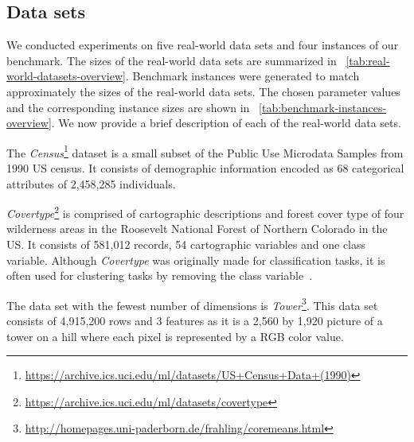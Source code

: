 

\subsection{Data sets}
We conducted experiments on five real-world data sets and four instances of our benchmark. The sizes of the real-world data sets are summarized in ~\cref{tab:real-world-datasets-overview}. Benchmark instances were generated to match approximately the sizes of the real-world data sets. The chosen parameter values and the corresponding instance sizes are shown in ~\cref{tab:benchmark-instances-overview}. 
We now provide a brief description of each of the real-world data sets.

The \textit{Census}\footnote{\url{https://archive.ics.uci.edu/ml/datasets/US+Census+Data+(1990)}} dataset is a small subset of the Public Use Microdata Samples from 1990 US census. It consists of demographic information encoded as 68 categorical attributes of 2,458,285 individuals. 

\textit{Covertype}\footnote{\url{https://archive.ics.uci.edu/ml/datasets/covertype}} is comprised of cartographic descriptions and forest cover type of four wilderness areas in the Roosevelt National Forest of Northern Colorado in the US. It consists of 581,012 records, 54 cartographic variables and one class variable. Although \textit{Covertype} was originally made for classification tasks, it is often used for clustering tasks by removing the class variable~\cite{AckermannMRSLS12}.

The data set with the fewest number of dimensions is \textit{Tower}\footnote{\url{http://homepages.uni-paderborn.de/frahling/coremeans.html}}. This data set consists of 4,915,200 rows and 3 features as it is a 2,560 by 1,920 picture of a tower on a hill where each pixel is represented by a RGB color value. 

